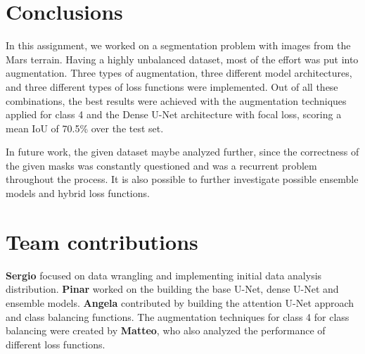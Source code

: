 \documentclass[11pt]{article}
\begin{document}
\begin{multicols}{2}
        

    \section{Conclusions}
      In this assignment, we worked on a segmentation problem with images from the Mars terrain. Having a highly unbalanced dataset, most of the effort was put into augmentation. Three types of augmentation, three different model architectures, and three different types of loss functions were implemented. Out of all these combinations, the best results were achieved with the augmentation techniques applied for class 4 and the Dense U-Net architecture with focal loss, scoring a mean IoU of 70.5\% over the test set. 
      
        In future work, the given dataset maybe analyzed further, since the correctness of the given masks was constantly questioned and was a recurrent problem throughout the process. It is also possible to further investigate possible ensemble models and hybrid loss functions.


    
   
    
    \section{Team contributions}
    
    \textbf{Sergio} focused on data wrangling and implementing initial data analysis distribution. \textbf{Pinar} worked on the building the base U-Net, dense U-Net and ensemble models. \textbf{Angela} contributed by building the attention U-Net approach and class balancing functions. The augmentation techniques for class 4 for class balancing were created by \textbf{Matteo}, who also analyzed the performance of different loss functions.

    
    

\end{multicols}
\end{document}
